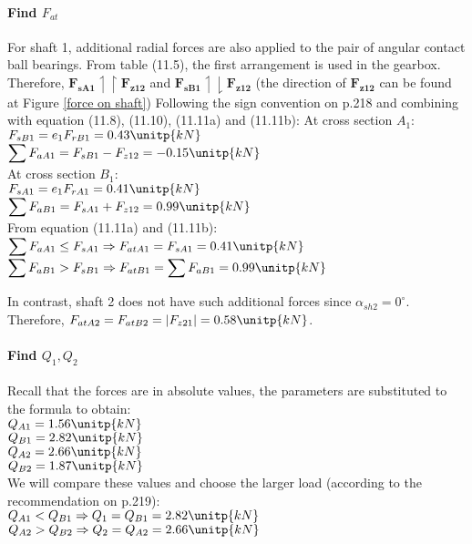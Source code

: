 \paragraph{Find $ F_{at} $} For shaft 1, additional radial forces are also applied to the pair of angular contact ball bearings. From table (11.5), the first arrangement is used in the gearbox. Therefore, $ \mathbf{F_{sA1}} \upharpoonleft\upharpoonright \mathbf{F_{z12}} $ and $ \mathbf{F_{sB1}} \upharpoonleft\downharpoonright \mathbf{F_{z12}} $ (the direction of $ \mathbf{F_{z12}} $ can be found at Figure \ref{force on shaft}) Following the sign convention on p.218 and combining with equation (11.8), (11.10), (11.11a) and (11.11b):
At cross section $ A_1 $:\\
$ F_{sB1} = e_1F_{rB1}  = 0.43\unitp{kN}$\\
$ \displaystyle\sum F_{aA1} = F_{sB1} - F_{z12} = -0.15 \unitp{kN}$\\
At cross section $ B_1 $:\\
$ F_{sA1} = e_1F_{rA1}  = 0.41\unitp{kN}$\\
$ \displaystyle\sum F_{aB1} = F_{sA1} + F_{z12} = 0.99 \unitp{kN}$\\
From equation (11.11a) and (11.11b):\\
$  \displaystyle\sum F_{aA1} \leq F_{sA1} \Rightarrow F_{atA1} = F_{sA1}  =  0.41\unitp{kN} $\\
$ \displaystyle \sum F_{aB1} > F_{sB1} \Rightarrow F_{atB1} = \sum F_{aB1}  =  0.99\unitp{kN} $

In contrast, shaft 2 does not have such additional forces since $ \alpha_{sh2} = 0^\circ $. Therefore, $ F_{atA2} = F_{atB2} = |F_{z21}| = 0.58\unitp{kN} $.

\paragraph{Find $ Q_1,Q_2 $}
Recall that the forces are in absolute values, the parameters are substituted to the formula to obtain:\\
$ Q_{A1} = 1.56 \unitp{kN} $\\
$ Q_{B1} = 2.82 \unitp{kN} $\\
$ Q_{A2} =2.66  \unitp{kN} $\\
$ Q_{B2} = 1.87 \unitp{kN} $\\
We will compare these values and choose the larger load (according to the recommendation on p.219):\\
$ Q_{A1} < Q_{B1} \Rightarrow Q_1 = Q_{B1}  = 2.82 \unitp{kN}$\\
$ Q_{A2} > Q_{B2} \Rightarrow Q_2 = Q_{A2}  = 2.66 \unitp{kN}$

